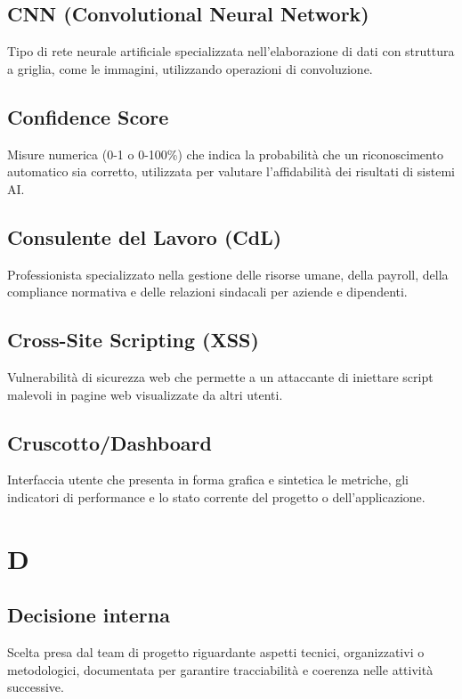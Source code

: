 \documentclass[a4paper,11pt]{article}
\begin{document}
\subsection{CNN (Convolutional Neural Network)}
Tipo di rete neurale artificiale specializzata nell'elaborazione di dati con struttura a griglia, come le immagini, utilizzando operazioni di convoluzione.

\subsection{Confidence Score}
Misure numerica (0-1 o 0-100\%) che indica la probabilità che un riconoscimento automatico sia corretto, utilizzata per valutare l'affidabilità dei risultati di sistemi AI.

\subsection{Consulente del Lavoro (CdL)}
Professionista specializzato nella gestione delle risorse umane, della payroll, della compliance normativa e delle relazioni sindacali per aziende e dipendenti.

\subsection{Cross-Site Scripting (XSS)}
Vulnerabilità di sicurezza web che permette a un attaccante di iniettare script malevoli in pagine web visualizzate da altri utenti.

\subsection{Cruscotto/Dashboard}
Interfaccia utente che presenta in forma grafica e sintetica le metriche, gli indicatori di performance e lo stato corrente del progetto o dell'applicazione.

\newpage
\section{D}

\subsection{Decisione interna}
Scelta presa dal team di progetto riguardante aspetti tecnici, organizzativi o metodologici, documentata per garantire tracciabilità e coerenza nelle attività successive.
\end{document}

